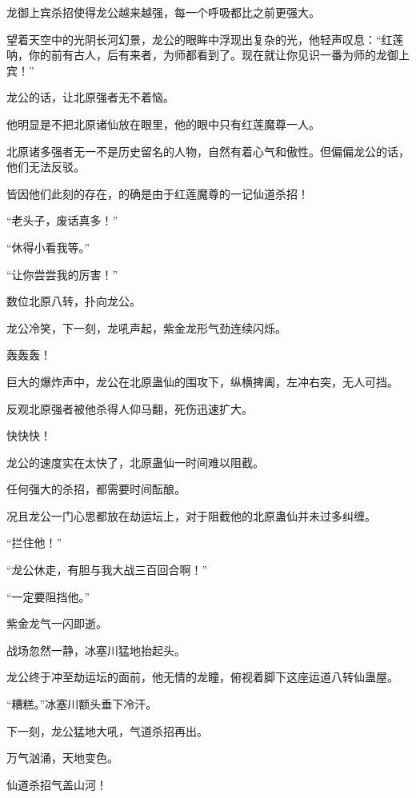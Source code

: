 
\begin{this_body}



龙御上宾杀招使得龙公越来越强，每一个呼吸都比之前更强大。

望着天空中的光阴长河幻景，龙公的眼眸中浮现出复杂的光，他轻声叹息：“红莲呐，你的前有古人，后有来者，为师都看到了。现在就让你见识一番为师的龙御上宾！”

龙公的话，让北原强者无不着恼。

他明显是不把北原诸仙放在眼里，他的眼中只有红莲魔尊一人。

北原诸多强者无一不是历史留名的人物，自然有着心气和傲性。但偏偏龙公的话，他们无法反驳。

皆因他们此刻的存在，的确是由于红莲魔尊的一记仙道杀招！

“老头子，废话真多！”

“休得小看我等。”

“让你尝尝我的厉害！”

数位北原八转，扑向龙公。

龙公冷笑，下一刻，龙吼声起，紫金龙形气劲连续闪烁。

轰轰轰！

巨大的爆炸声中，龙公在北原蛊仙的围攻下，纵横捭阖，左冲右突，无人可挡。

反观北原强者被他杀得人仰马翻，死伤迅速扩大。

快快快！

龙公的速度实在太快了，北原蛊仙一时间难以阻截。

任何强大的杀招，都需要时间酝酿。

况且龙公一门心思都放在劫运坛上，对于阻截他的北原蛊仙并未过多纠缠。

“拦住他！”

“龙公休走，有胆与我大战三百回合啊！”

“一定要阻挡他。”

紫金龙气一闪即逝。

战场忽然一静，冰塞川猛地抬起头。

龙公终于冲至劫运坛的面前，他无情的龙瞳，俯视着脚下这座运道八转仙蛊屋。

“糟糕。”冰塞川额头垂下冷汗。

下一刻，龙公猛地大吼，气道杀招再出。

万气汹涌，天地变色。

仙道杀招气盖山河！


\end{this_body}
